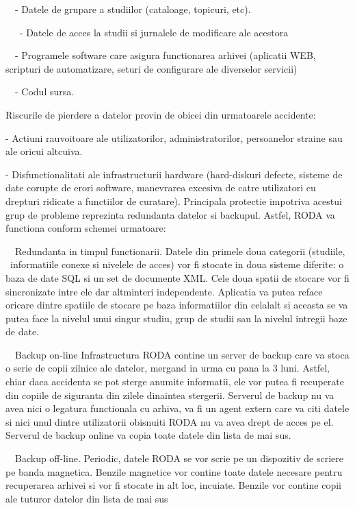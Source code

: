 {\sffamily\color{black}
\ \ {}- Datele de grupare a studiilor (cataloage, topicuri, etc).}

{\sffamily\color{black}
\ \ \ {}- Datele de acces la studii si jurnalele de modificare ale acestora}

{\sffamily\color{black}
\ \ {}- Programele software care asigura functionarea arhivei (aplicatii WEB, scripturi de automatizare, seturi de
configurare ale diverselor servicii)}

{\sffamily\color{black}
\ \ {}- Codul sursa.}

Riscurile de pierdere a datelor provin de obicei din urmatoarele accidente:

{\sffamily\color{black}
{}- Actiuni rauvoitoare ale utilizatorilor, administratorilor, persoanelor straine sau ale oricui altcuiva. }

{\sffamily\color{black}
{}- Disfunctionalitati ale infrastructurii hardware (hard-diskuri defecte, sisteme de date corupte de erori software,
manevrarea excesiva de catre utilizatori cu drepturi ridicate a functiilor de curatare). Principala protectie impotriva
acestui grup de probleme reprezinta redundanta datelor si backupul. Astfel, RODA va functiona conform schemei
urmatoare:}

{\sffamily\color{black}
\ \ Redundanta in timpul functionarii. Datele din primele doua categorii (studiile, \ informatiile conexe si nivelele de
acces) vor fi stocate in doua sisteme diferite: o baza de date SQL si un set de documente XML. Cele doua spatii de
stocare vor fi sincronizate intre ele dar altminteri independente. Aplicatia va putea reface oricare dintre spatiile de
stocare pe baza informatiilor din celalalt si aceasta se va putea face la nivelul unui singur studiu, grup de studii
sau la nivelul intregii baze de date.}

{\sffamily\color{black}
\ \ Backup on-line Infrastructura RODA contine un server de backup care va stoca o serie de copii zilnice ale datelor,
mergand in urma cu pana la 3 luni. Astfel, chiar daca accidenta se pot sterge anumite informatii, ele vor putea fi
recuperate din copiile de siguranta din zilele dinaintea stergerii. Serverul de backup nu va avea nici o legatura
functionala cu arhiva, va fi un agent extern care va citi datele si nici unul dintre utilizatorii obisnuiti RODA nu va
avea drept de acces pe el. Serverul de backup online va copia toate datele din lista de mai sus.}

{\sffamily\color{black}
\ \ Backup off-line. Periodic, datele RODA se vor scrie pe un dispozitiv de scriere pe banda magnetica. Benzile
magnetice vor contine toate datele necesare pentru recuperarea arhivei si vor fi stocate in alt loc, incuiate. Benzile
vor contine copii ale tuturor datelor din lista de mai sus }

